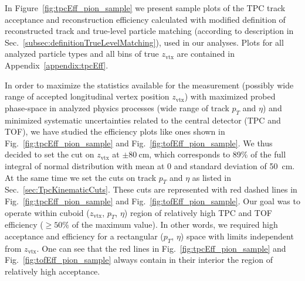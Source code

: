 In Figure~\ref{fig:tpcEff_pion_sample} we present sample plots of the TPC track acceptance and reconstruction efficiency calculated with modified definition of reconstructed track and true-level particle matching (according to description in Sec.~\ref{subsec:definitionTrueLevelMatching}), used in our analyses. Plots for all analyzed particle types and all bins of true $z_{\text{vtx}}$ are contained in Appendix~\ref{appendix:tpcEff}.

In order to maximize the statistics available for the measurement (possibly wide range of accepted longitudinal vertex position $z_{\text{vtx}}$) with maximized probed phase-space in analyzed physics processes (wide range of track $p_{T}$ and $\eta$) and minimized systematic uncertainties related to the central detector (TPC and TOF), we have studied the efficiency plots like ones shown in Fig.~\ref{fig:tpcEff_pion_sample} and Fig.~\ref{fig:tofEff_pion_sample}. We thus decided to set the cut on $z_{\text{vtx}}$ at $\pm80~\text{cm}$, which corresponds to 89\% of the full integral of normal distribution with mean at 0 and standard deviation of 50~cm. At the same time we set the cuts on track $p_{T}$ and $\eta$ as listed in Sec.~\ref{sec:TpcKinematicCuts}. These cuts are represented with red dashed lines in Fig.~\ref{fig:tpcEff_pion_sample} and Fig.~\ref{fig:tofEff_pion_sample}. Our goal was to operate within cuboid ($z_{\text{vtx}}$, $p_{T}$, $\eta$) region of relatively high TPC and TOF efficiency ($\geq50\%$ of the maximum value). In other words, we required high acceptance and efficiency for a rectangular ($p_{T}$, $\eta$) space with limits independent from $z_{\text{vtx}}$. One can see that the red lines in Fig.~\ref{fig:tpcEff_pion_sample} and Fig.~\ref{fig:tofEff_pion_sample} always contain in their interior the region of relatively high acceptance.

